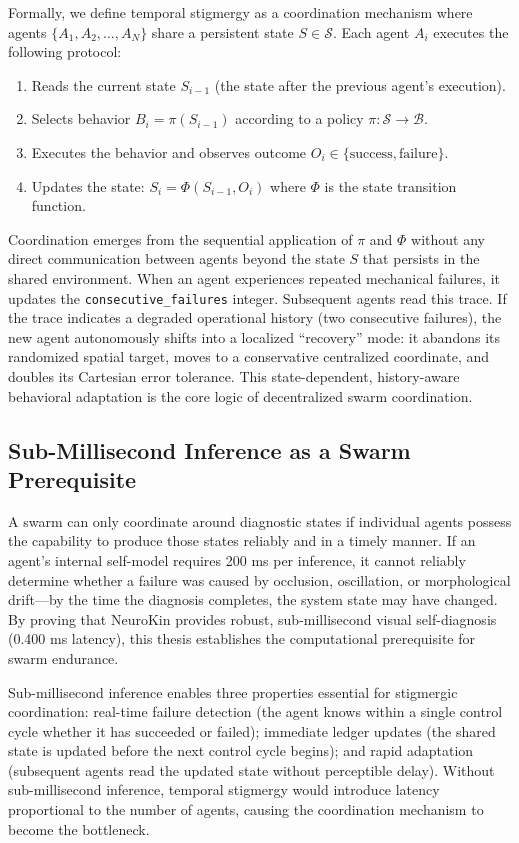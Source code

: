 \documentclass[12pt,a4paper,oneside]{report}
\begin{document}
Formally, we define temporal stigmergy as a coordination mechanism where agents $\{A_1, A_2, \ldots, A_N\}$ share a persistent state $S \in \mathcal{S}$. Each agent $A_i$ executes the following protocol:
\begin{enumerate}
    \item Reads the current state $S_{i-1}$ (the state after the previous agent's execution).
    \item Selects behavior $B_i = \pi(S_{i-1})$ according to a policy $\pi: \mathcal{S} \rightarrow \mathcal{B}$.
    \item Executes the behavior and observes outcome $O_i \in \{\text{success}, \text{failure}\}$.
    \item Updates the state: $S_i = \Phi(S_{i-1}, O_i)$ where $\Phi$ is the state transition function.
\end{enumerate}
Coordination emerges from the sequential application of $\pi$ and $\Phi$ without any direct communication between agents beyond the state $S$ that persists in the shared environment. When an agent experiences repeated mechanical failures, it updates the \texttt{consecutive\_failures} integer. Subsequent agents read this trace. If the trace indicates a degraded operational history (two consecutive failures), the new agent autonomously shifts into a localized ``recovery'' mode: it abandons its randomized spatial target, moves to a conservative centralized coordinate, and doubles its Cartesian error tolerance. This state-dependent, history-aware behavioral adaptation is the core logic of decentralized swarm coordination.

\subsection{Sub-Millisecond Inference as a Swarm Prerequisite}

A swarm can only coordinate around diagnostic states if individual agents possess the capability to produce those states reliably and in a timely manner. If an agent's internal self-model requires 200 ms per inference, it cannot reliably determine whether a failure was caused by occlusion, oscillation, or morphological drift---by the time the diagnosis completes, the system state may have changed. By proving that NeuroKin provides robust, sub-millisecond visual self-diagnosis (0.400 ms latency), this thesis establishes the computational prerequisite for swarm endurance.

Sub-millisecond inference enables three properties essential for stigmergic coordination: real-time failure detection (the agent knows within a single control cycle whether it has succeeded or failed); immediate ledger updates (the shared state is updated before the next control cycle begins); and rapid adaptation (subsequent agents read the updated state without perceptible delay). Without sub-millisecond inference, temporal stigmergy would introduce latency proportional to the number of agents, causing the coordination mechanism to become the bottleneck.
\end{document}
